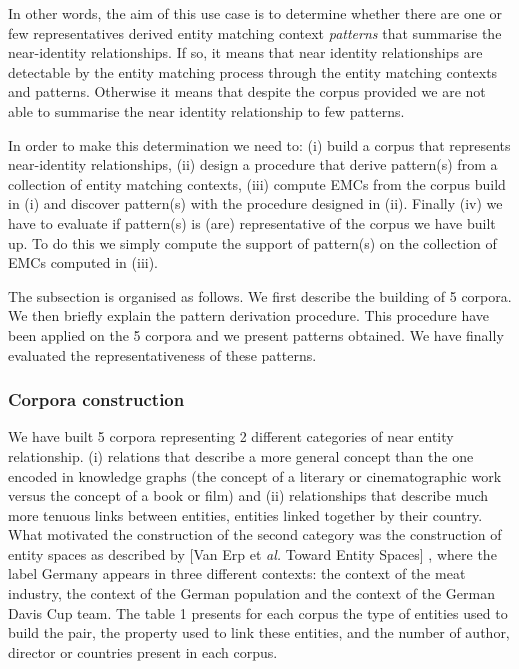 \documentclass[runningheads]{llncs}
\begin{document}
In other words, the aim of this use case is to determine whether there are one or few representatives derived entity matching context \textit{patterns} that summarise the near-identity relationships. 
If so, it means that near identity relationships are detectable by the entity matching process through the entity matching contexts and patterns.
Otherwise it means that despite the corpus provided we are not able to summarise the near identity relationship to few patterns. 


In order to make this determination we need to: (i) build a corpus  that represents near-identity relationships, (ii) design a procedure that derive pattern(s) from a collection of entity matching contexts, (iii) compute EMCs  from the corpus build in (i) and discover pattern(s) with the procedure designed in (ii).
Finally (iv) we have to evaluate if pattern(s) is (are) representative of the corpus we have built up.
To do this we simply compute the support of pattern(s) on the collection of EMCs computed in (iii). 
    
The subsection is organised as follows. 
We first describe the building of 5 corpora.
We then briefly explain the pattern derivation procedure.
This procedure have been applied on the 5 corpora and  
we present patterns obtained. 
We have finally evaluated the representativeness of these patterns.

\subsubsection{Corpora construction}
We have built 5 corpora representing 2 different categories of near entity relationship. (i) relations that describe a more general concept than the one encoded in knowledge graphs (the concept of a literary or cinematographic work versus the concept of a book or film) and 
(ii) relationships that describe much more tenuous links between entities, entities linked together by their country.  
What motivated the construction of the second category was the construction of entity spaces as described by [Van Erp et \textit{al.} Toward Entity Spaces] , where the label Germany appears in three different contexts: the context of the meat industry, the context of the German population and the context of the German Davis Cup team. 
The table 1 presents for each corpus the type of entities used to build the pair, the property used to link these entities, and the number of author, director or countries present in each corpus. 
 
\end{document}

